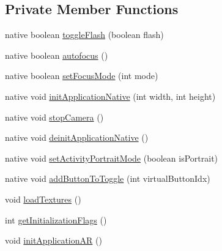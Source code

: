 \subsection*{\-Private \-Member \-Functions}
\begin{DoxyCompactItemize}
\item 
native boolean \hyperlink{classsrdes_1_1menupp_1_1_qcar_engine_a1fc8d43d73a1699e30b7cc349dd80834}{toggle\-Flash} (boolean flash)
\item 
native boolean \hyperlink{classsrdes_1_1menupp_1_1_qcar_engine_a9e48eb347526ed943c0a4ef0e920ecf3}{autofocus} ()
\item 
native boolean \hyperlink{classsrdes_1_1menupp_1_1_qcar_engine_a8b9d88ea19845152b159a2c15f3bef4a}{set\-Focus\-Mode} (int mode)
\item 
native void \hyperlink{classsrdes_1_1menupp_1_1_qcar_engine_a6c1b1609add51bf91d3756fc881c09f7}{init\-Application\-Native} (int width, int height)
\item 
native void \hyperlink{classsrdes_1_1menupp_1_1_qcar_engine_a0acb5cc975cdd829f974f96b47632996}{stop\-Camera} ()
\item 
native void \hyperlink{classsrdes_1_1menupp_1_1_qcar_engine_ad3cf615bcc44da3de16744ac2f19eee4}{deinit\-Application\-Native} ()
\item 
native void \hyperlink{classsrdes_1_1menupp_1_1_qcar_engine_a40c99c17cad41f810186f0dd714e71dd}{set\-Activity\-Portrait\-Mode} (boolean is\-Portrait)
\item 
native void \hyperlink{classsrdes_1_1menupp_1_1_qcar_engine_ad31e0bfd7503426b0a2932e9aea61080}{add\-Button\-To\-Toggle} (int virtual\-Button\-Idx)
\item 
void \hyperlink{classsrdes_1_1menupp_1_1_qcar_engine_ade3c2eea0a51633e0e8919c711d99d4c}{load\-Textures} ()
\item 
int \hyperlink{classsrdes_1_1menupp_1_1_qcar_engine_a9ee7f743a9d2f9f3ee728be169b88992}{get\-Initialization\-Flags} ()
\item 
void \hyperlink{classsrdes_1_1menupp_1_1_qcar_engine_a7c44ea7480a6980104f61fee68b26e12}{init\-Application\-A\-R} ()
\end{DoxyCompactItemize}
